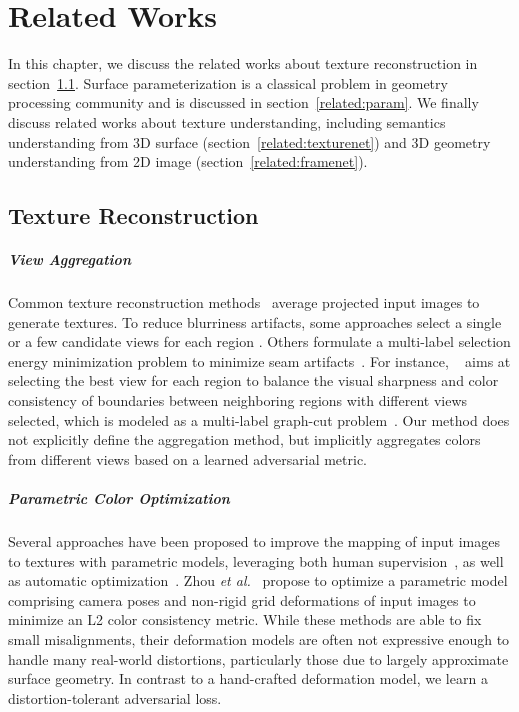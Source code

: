 \chapter{Related Works}
\label{chapter:related}
In this chapter, we discuss the related works about texture reconstruction in section~\ref{related:texture-recon}. Surface parameterization is a classical problem in geometry processing community and is discussed in section~\ref{related:param}. We finally discuss related works about texture understanding,  including semantics understanding from 3D surface (section~\ref{related:texturenet}) and 3D geometry understanding from 2D image (section~\ref{related:framenet}).

\section{Texture Reconstruction}
\label{related:texture-recon}
\paragraph*{View Aggregation} Common texture reconstruction methods~\cite{izadi2011kinectfusion,zhou2014color} average projected input images to generate textures.  
To reduce blurriness artifacts, some approaches select a single or a few candidate views for each region \cite{dessein2014seamless}. Others formulate a multi-label selection energy minimization problem to minimize seam artifacts~\cite{lempitsky2007seamless,sinha2008interactive,velho2007projective,waechter2014let,huang20173dlite}. For instance, ~\cite{huang20173dlite} aims at selecting the best view for each region to balance the visual sharpness and color consistency of boundaries between neighboring regions with different views selected, which is modeled as a multi-label graph-cut problem~\cite{boykov2001fast}. Our method does not explicitly define the aggregation method, but implicitly aggregates colors from different views based on a learned adversarial metric.

\paragraph*{Parametric Color Optimization}
Several approaches have been proposed to improve the mapping of input images to textures with parametric models, %
leveraging both human supervision~\cite{franken2005minimizing,ofek1997multiresolution,pighin2006synthesizing,xu2019deep}, as well as automatic optimization~\cite{bernardini2001high,pulli2000surface}.  
Zhou \textit{et al.}~\cite{zhou2014color} propose to optimize a parametric model comprising camera poses and non-rigid grid deformations of input images to minimize an L2 color consistency metric. 
While these methods are able to fix small misalignments, their deformation models are often not expressive enough to handle many real-world distortions, particularly those due to largely approximate surface geometry. 
In contrast to a hand-crafted deformation model, we learn a distortion-tolerant adversarial loss.

